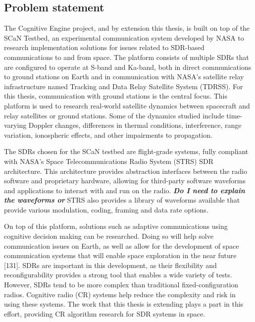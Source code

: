 	\subsection{Problem statement}
	\par The Cognitive Engine project, and by extension this thesis, is built on top of the SCaN Testbed, an experimental communication system developed by NASA to research implementation solutions for issues related to SDR-based communications to and from space. The platform consists of multiple SDRs that are configured to operate at S-band and Ka-band, both in direct communications to ground stations on Earth and in communication with NASA's satellite relay infrastructure named Tracking and Data Relay Satellite System (TDRSS). For this thesis, communication with ground stations is the central focus. This platform is used to research real-world satellite dynamics between spacecraft and relay satellites or ground stations. Some of the dynamics studied include time-varying Doppler changes, differences in thermal conditions, interference, range variation, ionospheric effects, and other impairments to propagation.
	\par The SDRs chosen for the SCaN testbed are flight-grade systems, fully compliant with NASA's Space Telecommunications Radio System (STRS) SDR architecture. This architecture provides abstraction interfaces between the radio software and proprietary hardware, allowing for third-party software waveforms and applications to interact with and run on the radio. \textbf{\textit{Do I need to explain the waveforms or}} STRS also provides a library of waveforms available that provide various modulation, coding, framing and data rate options. 
	\par On top of this platform, solutions such as adaptive communications using cognitive decision making can be researched. Doing so will help solve communication issues on Earth, as well as allow for the development of space communication systems that will enable space exploration in the near future [131]. SDRs are important in this development, as their flexibility and reconfigurability provides a strong tool that enables a wide variety of tests. However, SDRs tend to be more complex than traditional fixed-configuration radios. Cognitive radio (CR) systems help reduce the complexity and risk in using these systems. The work that this thesis is extending plays a part in this effort, providing CR algorithm research for SDR systems in space.    
